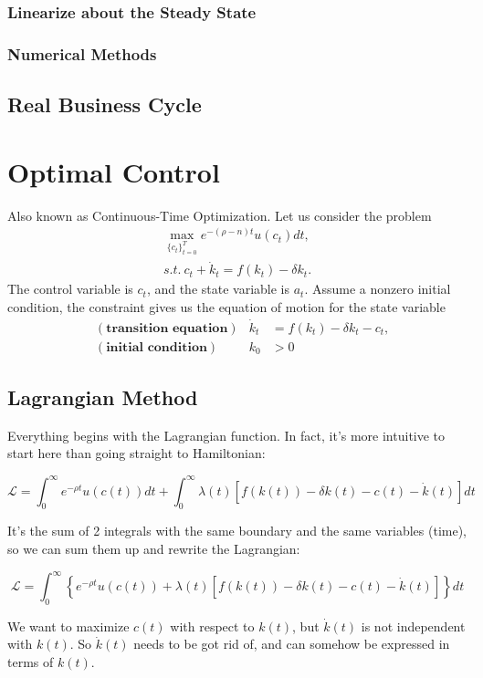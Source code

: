 \documentclass[11pt,a4paper]{book}
\theoremstyle{definition}\newtheorem{definition}{Definition}
\theoremstyle{definition}\newtheorem{fact}{Fact}
\theoremstyle{definition}\newtheorem{remark}{Remark}
\theoremstyle{definition}\newtheorem{ex}{Ex.}
\theoremstyle{definition}\newtheorem{project}{Project}
\theoremstyle{definition}\newtheorem{problem}{Problem}
\theoremstyle{definition}\newtheorem{example}{Example}
\numberwithin{theorem}{section}
\numberwithin{corollary}{chapter}
\numberwithin{assumption}{chapter}
\numberwithin{definition}{chapter}
\numberwithin{prop}{chapter}
\numberwithin{notation}{chapter}
\numberwithin{problem}{chapter}
\numberwithin{example}{chapter}
\numberwithin{fact}{chapter}
\numberwithin{ex}{chapter}
\begin{document}
	\subsection{Linearize about the Steady State}
	\subsection{Numerical Methods}
	
	\section{Real Business Cycle}
	
	\chapter{Optimal Control}
	Also known as Continuous-Time Optimization. Let us consider the problem
	\begin{align}
		\max_{ \{c_t\}^T_{t=0} } e^{-(\rho-n) t} u(c_t)  dt, \\
		s.t. \ c_t + \dot{k}_t = f(k_t) - \delta k_t.
	\end{align}
	The control variable is $c_t$, and the state variable is $a_t$. Assume a nonzero initial condition, the constraint gives us the equation of motion for the state variable
	\begin{align*}
		&(\textbf{transition equation}) & \dot{k}_t &= f(k_t) - \delta k_t - c_t, \\
		&(\textbf{initial condition}) & k_0 &> 0
	\end{align*}

	
	\section{Lagrangian Method}
	Everything begins with the Lagrangian function. In fact, it's more intuitive to start here than going straight to Hamiltonian:

$$
    \mathcal{L} = \int_{0}^{\infty} e^{-\rho t} u(c(t)) dt + \int_{0}^{\infty} \lambda(t) \left[ f( k(t)) - \delta k(t) - c(t) - \dot{k}(t) \right] dt
$$

It's the sum of 2 integrals with the same boundary and the same variables (time), so we can sum them up and rewrite the Lagrangian:

$$
    \mathcal{L} = \int_{0}^{\infty} \left\{ e^{-\rho t} u(c(t)) + \lambda(t) \left[ f( k(t)) - \delta k(t) - c(t) - \dot{k}(t) \right] \right\} dt
$$

We want to maximize $c(t)$ with respect to $k(t)$, but $\dot{k}(t)$ is not independent with $k(t)$. So $\dot{k}(t)$ needs to be got rid of, and can somehow be expressed in terms of $k(t)$.
\end{document}
